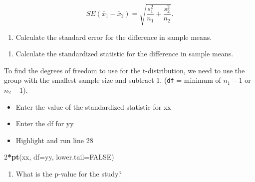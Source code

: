 \documentclass[
]{report}
\newenvironment{Shaded}{\begin{snugshade}}{\end{snugshade}}
\newcommand{\AttributeTok}[1]{\textcolor[rgb]{0.13,0.29,0.53}{#1}}
\newcommand{\ConstantTok}[1]{\textcolor[rgb]{0.56,0.35,0.01}{#1}}
\newcommand{\DecValTok}[1]{\textcolor[rgb]{0.00,0.00,0.81}{#1}}
\newcommand{\FunctionTok}[1]{\textcolor[rgb]{0.13,0.29,0.53}{\textbf{#1}}}
\newcommand{\NormalTok}[1]{#1}
\newcommand{\SpecialCharTok}[1]{\textcolor[rgb]{0.81,0.36,0.00}{\textbf{#1}}}
\providecommand{\tightlist}{%
  \setlength{\itemsep}{0pt}\setlength{\parskip}{0pt}}
\begin{document}
\[SE(\bar{x}_1 -\bar{x}_2)=\sqrt{\frac{s_1^2}{n_1}+\frac{s_2^2}{n_2}}.\]

\begin{enumerate}
\def\labelenumi{\arabic{enumi}.}
\setcounter{enumi}{5}
\tightlist
\item
  Calculate the standard error for the difference in sample means.
\end{enumerate}

\vspace{0.5in}

\begin{enumerate}
\def\labelenumi{\arabic{enumi}.}
\setcounter{enumi}{6}
\tightlist
\item
  Calculate the standardized statistic for the difference in sample means.
\end{enumerate}

\vspace{0.5in}

To find the degrees of freedom to use for the t-distribution, we need to use the group with the smallest sample size and subtract 1. (\texttt{df} = minimum of \(n_1 - 1\) or \(n_2 - 1\)).

\vspace{0.2in}

\begin{itemize}
\item
  Enter the value of the standardized statistic for xx
\item
  Enter the df for yy
\item
  Highlight and run line 28
\end{itemize}

\begin{Shaded}
\begin{Highlighting}[]
\DecValTok{2}\SpecialCharTok{*}\FunctionTok{pt}\NormalTok{(xx, }\AttributeTok{df=}\NormalTok{yy, }\AttributeTok{lower.tail=}\ConstantTok{FALSE}\NormalTok{)}
\end{Highlighting}
\end{Shaded}

\vspace{0.3in}

\begin{enumerate}
\def\labelenumi{\arabic{enumi}.}
\setcounter{enumi}{7}
\tightlist
\item
  What is the p-value for the study?
\end{enumerate}

\vspace{0.2in}
\end{document}
